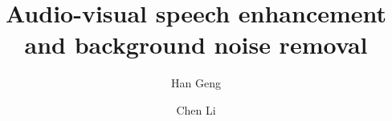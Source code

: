 \documentclass[runningheads,a4paper]{llncs}
\begin{document}

\title{Audio-visual speech enhancement and background noise removal}



%
%
\author{Han Geng\and Chen Li}



%
%

\maketitle
\end{document}
